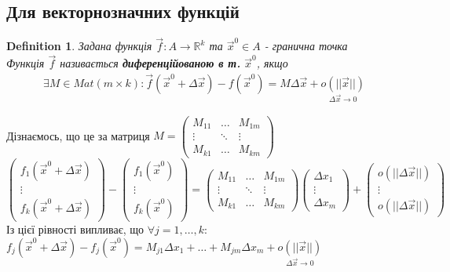 \documentclass[a4paper, 14pt]{extarticle}
\theoremstyle{theoremdd}
\theoremstyle{theoremdd}
\newtheorem{definition}[theorem]{Definition}
\theoremstyle{theoremdd}
\theoremstyle{theoremdd}
\theoremstyle{theoremdd}
\theoremstyle{theoremdd}
\theoremstyle{theoremdd}
\begin{document}
\subsection{Для векторнозначних функцій}
\begin{definition}
Задана функція $\vec{f}: A \to \mathbb{R}^k$ та $\vec{x}^0 \in A$ - гранична точка\\
Функція $\vec{f}$ називається \textbf{диференційованою в т.} $\vec{x}^0$, якщо
\begin{align*}
\exists M \in Mat(m \times k): \vec{f}(\vec{x}^0 + \Delta \vec{x}) - f(\vec{x}^0) = M \Delta \vec{x} + \underset{\Delta \vec{x} \to 0}{o(||\vec{x}||)}
\end{align*}
\end{definition}
Дізнаємось, що це за матриця $M = \begin{pmatrix}
M_{11} & \dots & M_{1m} \\
\vdots & \ddots & \vdots \\
M_{k1} & \dots & M_{km}
\end{pmatrix}$\\
$\begin{pmatrix}
f_1(\vec{x}^0 + \Delta \vec{x}) \\ \vdots \\ f_k(\vec{x}^0 + \Delta \vec{x})
\end{pmatrix} - \begin{pmatrix}
f_1(\vec{x}^0) \\ \vdots \\ f_k(\vec{x}^0)
\end{pmatrix} = \begin{pmatrix}
M_{11} & \dots & M_{1m} \\
\vdots & \ddots & \vdots \\
M_{k1} & \dots & M_{km}
\end{pmatrix} \begin{pmatrix}
\Delta x_1 \\ \vdots \\ \Delta x_m
\end{pmatrix} + \begin{pmatrix}
o(||\Delta \vec{x}||) \\ \vdots \\ o(||\Delta \vec{x}||)
\end{pmatrix}$\\
Із цієї рівності випливає, що $\forall j = 1,\dots,k:$\\
$f_j(\vec{x}^0 + \Delta \vec{x}) - f_j(\vec{x}^0) = M_{j1} \Delta x_1 + \dots + M_{jm} \Delta x_m + \underset{\Delta \vec{x} \to 0}{o(||\vec{x}||)}$\\
\end{document}

